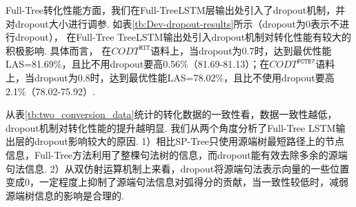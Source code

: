 Full-Tree转化性能方面，我们在Full-TreeLSTM层输出处引入了dropout机制，并对dropout大小进行调参. 如表\ref{tb:Dev-dropout-results}所示（dropout为0表示不进行dropout），
在Full-Tree  TreeLSTM输出处引入dropout机制对转化性能有较大的积极影响. 具体而言，
在$CODT^{\texttt{HIT}}$语料上，当dropout为0.7时，达到最优性能LAS=81.69\%，且比不用dropout要高0.56\%（81.69-81.13）；在$CODT^{\texttt{PCTB7}}$语料上，当dropout为0.8时，达到最优性能LAS=78.02\%，且比不使用dropout要高2.1\%（78.02-75.92）.

从表\ref{tb:two_conversion_data}统计的转化数据的一致性看，数据一致性越低，dropout机制对转化性能的提升越明显. 我们从两个角度分析了Full-Tree LSTM输出层的dropout影响较大的原因. 1）相比SP-Tree只使用源端树最短路径上的节点信息，Full-Tree方法利用了整棵句法树的信息，而dropout能有效去除多余的源端句法信息. 2）从双仿射运算机制上来看，dropout将源端句法表示向量的一些位置变成0，一定程度上抑制了源端句法信息对弧得分的贡献，当一致性较低时，减弱源端树信息的影响是合理的.

